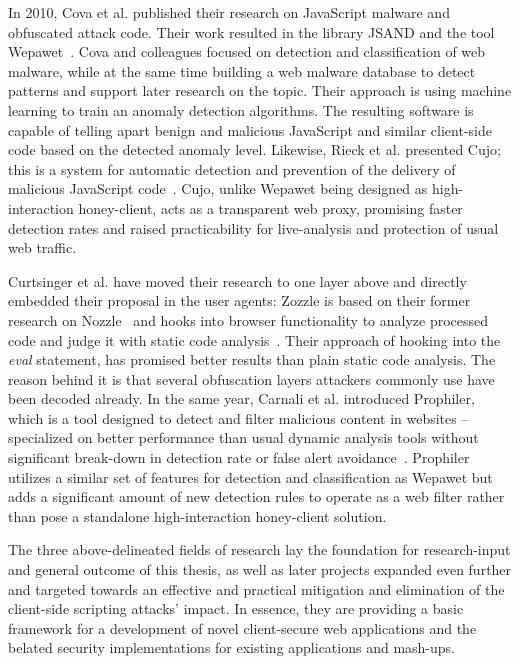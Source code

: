 \begin{itemize}
      In 2010, Cova et al. published their research on JavaScript malware and obfuscated attack code. Their work resulted in the library JSAND and the tool Wepawet~\cite{cova2010detection}. Cova and colleagues focused on detection and classification of web malware, while at the same time building a web malware database to detect patterns and support later research on the topic. Their approach is using machine learning to train an anomaly detection algorithms. The resulting software is capable of telling apart benign and malicious JavaScript and similar client-side code based on the detected anomaly level. Likewise, Rieck et al. presented Cujo; this is a system for automatic detection and prevention of the delivery of malicious JavaScript code~\cite{rieck2010cujo}. Cujo, unlike Wepawet being designed as high-interaction honey-client, acts as a transparent web proxy, promising faster detection rates and raised practicability for live-analysis and protection of usual web traffic.

      Curtsinger et al. have moved their research to one layer above and directly embedded their proposal in the user agents: Zozzle is based on their former research on Nozzle~\cite{ratanaworabhan2009nozzle} and hooks into browser functionality to analyze processed code and judge it with static code analysis~\cite{curtsinger2011zozzle}. Their approach of hooking into the \textit{eval} statement, has promised better results than plain static code analysis. The reason behind it is that several obfuscation layers attackers commonly use have been decoded already. In the same year, Carnali et al. introduced Prophiler, which is a tool designed to detect and filter malicious content in websites -- specialized on better performance than usual dynamic analysis tools without significant break-down in detection rate or false alert avoidance~\cite{canali2011prophiler}. Prophiler utilizes a similar set of features for detection and classification as Wepawet but adds a significant amount of new detection rules to operate as a web filter rather than pose a standalone high-interaction honey-client solution.
  \end{itemize}

  The three above-delineated fields of research lay the foundation for research-input and general outcome of this thesis, as well as later projects expanded even further and targeted towards an effective and practical mitigation and elimination of the client-side scripting attacks' impact. In essence, they are providing a basic framework for a development of novel client-secure web applications and the belated security implementations for existing applications and mash-ups. \\


